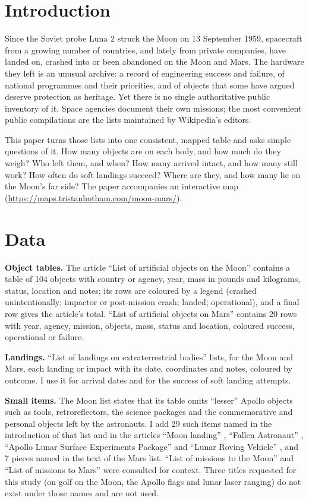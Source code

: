 \documentclass[11pt,a4paper]{article}
\begin{document}
\section{Introduction}
Since the Soviet probe Luna 2 struck the Moon on 13 September 1959, spacecraft from a growing number of countries, and lately from private companies, have landed on, crashed into or been abandoned on the Moon and Mars. The hardware they left is an unusual archive: a record of engineering success and failure, of national programmes and their priorities, and of objects that some have argued deserve protection as heritage. Yet there is no single authoritative public inventory of it. Space agencies document their own missions; the most convenient public compilations are the lists maintained by Wikipedia's editors.

This paper turns those lists into one consistent, mapped table and asks simple questions of it. How many objects are on each body, and how much do they weigh? Who left them, and when? How many arrived intact, and how many still work? How often do soft landings succeed? Where are they, and how many lie on the Moon's far side? The paper accompanies an interactive map (\url{https://maps.tristanhotham.com/moon-mars/}).

\section{Data}
\textbf{Object tables.} The article ``List of artificial objects on the Moon'' \citep{wikimoon} contains a table of 104 objects with country or agency, year, mass in pounds and kilograms, status, location and notes; its rows are coloured by a legend (crashed unintentionally; impactor or post-mission crash; landed; operational), and a final row gives the article's total. ``List of artificial objects on Mars'' \citep{wikimars} contains 20 rows with year, agency, mission, objects, mass, status and location, coloured success, operational or failure.

\textbf{Landings.} ``List of landings on extraterrestrial bodies'' \citep{wikilandings} lists, for the Moon and Mars, each landing or impact with its date, coordinates and notes, coloured by outcome. I use it for arrival dates and for the success of soft landing attempts.

\textbf{Small items.} The Moon list states that its table omits ``lesser'' Apollo objects such as tools, retroreflectors, the science packages and the commemorative and personal objects left by the astronauts. I add 29 such items named in the introduction of that list and in the articles ``Moon landing'' \citep{wikimoonlanding}, ``Fallen Astronaut'' \citep{wikifallen}, ``Apollo Lunar Surface Experiments Package'' \citep{wikialsep} and ``Lunar Roving Vehicle'' \citep{wikilrv}, and 7 pieces named in the text of the Mars list. ``List of missions to the Moon'' and ``List of missions to Mars'' \citep{wikimissionsmoon,wikimissionsmars} were consulted for context. Three titles requested for this study (on golf on the Moon, the Apollo flags and lunar laser ranging) do not exist under those names and are not used.
\end{document}
